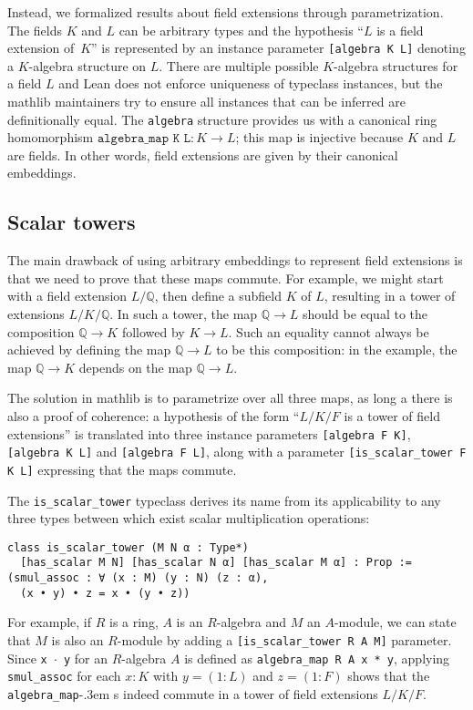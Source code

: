 \documentclass[sn-mathphys]{sn-jnl}%
\newcommand{\lean}[1]{\texttt{#1}\xspace}
\newcommand{\mathlib}{\textsf{mathlib}\xspace}
\newcommand{\QQ}{\mathbb{Q}}
\begin{document}
Instead, we formalized results about field extensions through parametrization. The fields $K$ and $L$ can be arbitrary types
and the hypothesis ``$L$ is a field extension of~$K$'' is represented by an instance parameter \lean{[algebra K L]} denoting a $K$-algebra structure on $L$.
There are multiple possible $K$-algebra structures for a field $L$ and Lean does not enforce uniqueness of typeclass instances,
but the \mathlib maintainers try to ensure all instances that can be inferred are definitionally equal.
The \lean{algebra} structure provides us with a canonical ring homomorphism $\lean{algebra\_map K L} : K \to L$; this map is injective because $K$ and $L$ are fields.
In other words, field extensions are given by their canonical embeddings.

\subsection{Scalar towers} \label{sec:scalar_tower}

The main drawback of using arbitrary embeddings to represent field extensions is that we need to prove that these maps commute.
For example, we might start with a field extension $L / \QQ$, then define a subfield $K$ of $L$,
resulting in a tower of extensions $L / K / \QQ$.
In such a tower, the map $\QQ \to L$ should be equal to the composition $\QQ \to K$ followed by $K \to L$.
Such an equality cannot always be achieved by defining the map $\QQ \to L$ to be this composition: in the example, the map $\QQ \to K$ depends on the map $\QQ \to L$.

The solution in \mathlib is to parametrize over all three maps, as long a there is also a proof of coherence:
a hypothesis of the form ``$L / K / F$ is a tower of field extensions'' is translated into three instance parameters \lean{[algebra F K]}, \lean{[algebra K L]} and \lean{[algebra F L]},
along with a parameter \lean{[is\_scalar\_tower F K L]} expressing that the maps commute.

The \lean{is\_scalar\_tower} typeclass derives its name from its applicability to any three types between which exist scalar multiplication operations:
\begin{lstlisting}
class is_scalar_tower (M N α : Type*)
  [has_scalar M N] [has_scalar N α] [has_scalar M α] : Prop :=
(smul_assoc : ∀ (x : M) (y : N) (z : α),
  (x • y) • z = x • (y • z))
\end{lstlisting}
For example, if $R$ is a ring, $A$ is an $R$-algebra and $M$ an $A$-module, we can state that $M$ is also an $R$-module by adding a \lean{[is\_scalar\_tower R A M]} parameter.
Since \lean{x~$\cdot$~y} for an $R$-algebra $A$ is defined as \lean{algebra\_map R A x * y}, applying \lean{smul\_assoc} for each $x : K$ with $y = (1 : L)$ and $z = (1 : F)$ shows that the \lean{algebra\_map}\kern-.3em s indeed commute in a tower of field extensions $L / K / F$.
\end{document}
